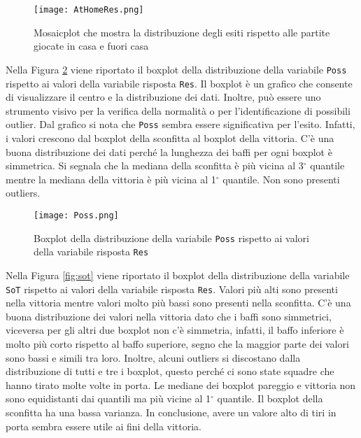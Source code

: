 \begin{figure}[htbp]
	\begin{center}
		\texttt{[image: AtHomeRes.png]}
		\caption{Mosaicplot che mostra la distribuzione degli esiti rispetto alle partite giocate in casa e fuori casa} \label{fig:AtHome}
	\end{center}
\end{figure}

Nella Figura \ref{fig:Poss} viene riportato il boxplot della distribuzione della variabile \texttt{Poss} rispetto ai valori della variabile risposta \texttt{Res}. Il boxplot è un grafico che consente di visualizzare il centro e la distribuzione dei dati. Inoltre, può essere uno strumento visivo per la verifica della normalità o per l'identificazione di possibili outlier. Dal grafico si nota che \texttt{Poss} sembra essere significativa per l'esito. Infatti, i valori crescono dal boxplot della sconfitta al boxplot della vittoria. C'è una buona distribuzione dei dati perché la lunghezza dei baffi per ogni boxplot è simmetrica. Si segnala che la mediana della sconfitta è più vicina al 3$^{\circ}$ quantile mentre la mediana della vittoria è più vicina al 1$^{\circ}$ quantile. Non sono presenti outliers.\\
\begin{figure}[htbp]
	\begin{center}
		\texttt{[image: Poss.png]}
		\caption{Boxplot della distribuzione della variabile \texttt{Poss} rispetto ai valori della variabile risposta \texttt{Res}} \label{fig:Poss}
	\end{center}
\end{figure}
Nella Figura \ref{fig:sot} viene riportato il boxplot della distribuzione della variabile \texttt{SoT} rispetto ai valori della variabile risposta \texttt{Res}. Valori più alti sono presenti nella vittoria mentre valori molto più bassi sono presenti nella sconfitta. C'è una buona distribuzione dei valori nella vittoria dato che i baffi sono simmetrici, viceversa per gli altri due boxplot non c'è simmetria, infatti, il baffo inferiore è molto più corto rispetto al baffo superiore, segno che la maggior parte dei valori sono bassi e simili tra loro. Inoltre, alcuni outliers si discostano dalla distribuzione di tutti e tre i boxplot, questo perché ci sono state squadre che hanno tirato molte volte in porta. Le mediane dei boxplot pareggio e vittoria non sono equidistanti dai quantili ma più vicine al 1$^{\circ}$ quantile. Il boxplot della sconfitta ha una bassa varianza. In conclusione, avere un valore alto di tiri in porta sembra essere utile ai fini della vittoria.\\
